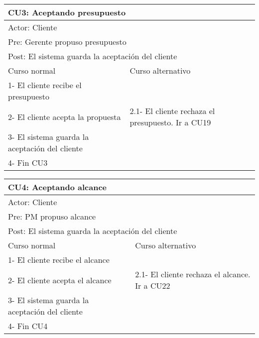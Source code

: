 \begin{table}[H]
  \begin{adjustbox}{max width = \textwidth}
  \begin{tabular}{|l|l|}
    \hline
    \multicolumn{2}{|l|}{CU3: Aceptando presupuesto} \\\hline
    \multicolumn{2}{|l|}{Actor: Cliente} \\\hline
    \multicolumn{2}{|l|}{Pre: Gerente propuso presupuesto} \\\hline
    \multicolumn{2}{|l|}{Post: El sistema guarda la aceptación del cliente} \\\hline
     Curso normal & Curso alternativo\\ \hline
     1- El cliente recibe el presupuesto & \\ \hline
     2- El cliente acepta la propuesta & 2.1- El cliente rechaza el presupuesto. Ir a CU19\\ \hline
     3- El sistema guarda la aceptación del cliente &\\ \hline
     4- Fin CU3 & \\ \hline
  \end{tabular}
  \end{adjustbox}
\end{table}

\begin{table}[H]
  \begin{adjustbox}{max width = \textwidth}
  \begin{tabular}{|l|l|}
    \hline
    \multicolumn{2}{|l|}{CU4: Aceptando alcance} \\\hline
    \multicolumn{2}{|l|}{Actor: Cliente} \\\hline
    \multicolumn{2}{|l|}{Pre: PM propuso alcance} \\\hline
    \multicolumn{2}{|l|}{Post: El sistema guarda la aceptación del cliente} \\\hline
     Curso normal & Curso alternativo\\ \hline
     1- El cliente recibe el alcance & \\ \hline
     2- El cliente acepta el alcance & 2.1- El cliente rechaza el alcance. Ir a CU22\\ \hline
     3- El sistema guarda la aceptación del cliente  &\\ \hline
     4- Fin CU4 & \\ \hline
  \end{tabular}
  \end{adjustbox}
\end{table}

